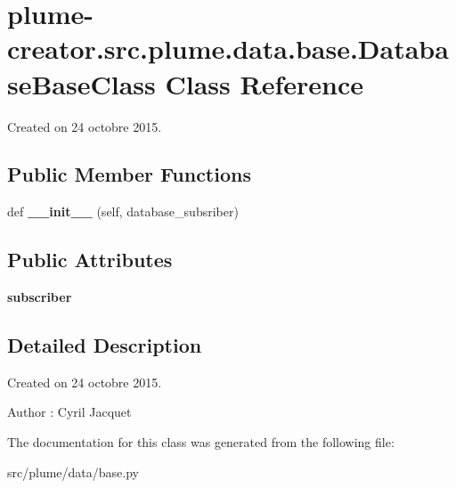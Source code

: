 \hypertarget{classplume-creator_1_1src_1_1plume_1_1data_1_1base_1_1_database_base_class}{}\section{plume-\/creator.src.\+plume.\+data.\+base.\+Database\+Base\+Class Class Reference}
\label{classplume-creator_1_1src_1_1plume_1_1data_1_1base_1_1_database_base_class}


Created on 24 octobre 2015.  


\subsection*{Public Member Functions}
\begin{DoxyCompactItemize}
\item 
def {\bfseries \+\_\+\+\_\+init\+\_\+\+\_\+} (self, database\+\_\+subsriber)\hypertarget{classplume-creator_1_1src_1_1plume_1_1data_1_1base_1_1_database_base_class_ad546b594e0ea216f257ed11c5dbecb96}{}\label{classplume-creator_1_1src_1_1plume_1_1data_1_1base_1_1_database_base_class_ad546b594e0ea216f257ed11c5dbecb96}

\end{DoxyCompactItemize}
\subsection*{Public Attributes}
\begin{DoxyCompactItemize}
\item 
{\bfseries subscriber}\hypertarget{classplume-creator_1_1src_1_1plume_1_1data_1_1base_1_1_database_base_class_a9811523d0556a49888b38b3b651ca01a}{}\label{classplume-creator_1_1src_1_1plume_1_1data_1_1base_1_1_database_base_class_a9811523d0556a49888b38b3b651ca01a}

\end{DoxyCompactItemize}


\subsection{Detailed Description}
Created on 24 octobre 2015. 

\begin{DoxyAuthor}{Author}
\+: Cyril Jacquet 
\end{DoxyAuthor}


The documentation for this class was generated from the following file\+:\begin{DoxyCompactItemize}
\item 
src/plume/data/base.\+py\end{DoxyCompactItemize}
